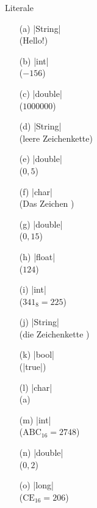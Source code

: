 \begin{exercise}{Literale}
\begin{solution}
\begin{center}
\begin{minipage}{0.3\textwidth}
\begin{itemize}
\item[(a)] \code|String| \\ (Hello!)
\item[(b)] \code|int|    \\ ($-156$)
\item[(c)] \code|double| \\ ($1000000$)
\item[(d)] \code|String| \\ (leere Zeichenkette)
\item[(e)] \code|double| \\ ($0{,}5$)
\end{itemize}
\end{minipage}
\begin{minipage}{0.3\textwidth}
\begin{itemize}
\item[(f)] \code|char|   \\ (Das Zeichen \grqq)
\item[(g)] \code|double| \\ ($0{,}15$)
\item[(h)] \code|float|  \\ ($124$)
\item[(i)] \code|int|    \\ ($341_8 = 225$)
\item[(j)] \code|String| \\ (die Zeichenkette \grqq)
\end{itemize}
\end{minipage}
\begin{minipage}{0.3\textwidth}
\begin{itemize}
\item[(k)] \code|bool| \\ (\code|true|)
\item[(l)] \code|char|    \\ (a)
\item[(m)] \code|int|     \\ ($\mathrm{ABC}_{16} = 2748$)
\item[(n)] \code|double|  \\ ($0{,}2$)
\item[(o)] \code|long|    \\ ($\mathrm{CE}_{16} = 206$)
\end{itemize}
\end{minipage}
\end{center}
\end{solution}

\end{exercise}
